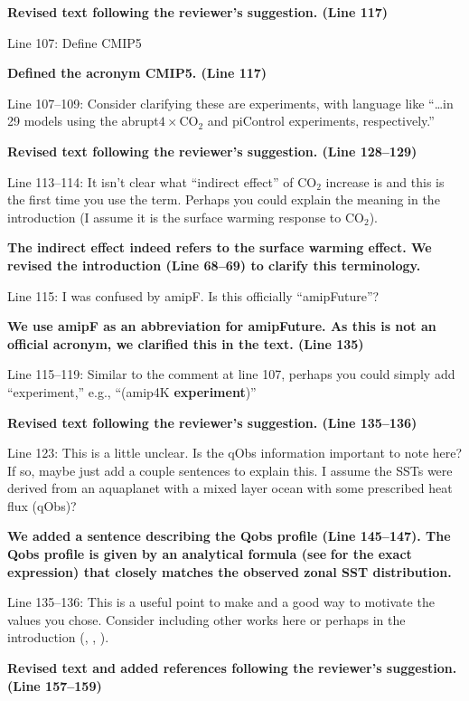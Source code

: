 \documentclass[11pt]{article}
\begin{document}
\textbf{Revised text following the reviewer's suggestion. (Line 117)}

Line 107: Define CMIP5

\textbf{Defined the acronym CMIP5. (Line 117)}

Line 107--109: Consider clarifying these are experiments, with language like ``\ldots{}in 29 models using the abrupt\(4\times\)CO\(_2\) and piControl experiments, respectively.''

\textbf{Revised text following the reviewer's suggestion. (Line 128--129)}

Line 113--114: It isn't clear what ``indirect effect'' of CO\(_2\) increase is and this is the first time you use the term. Perhaps you could explain the meaning in the introduction (I assume it is the surface warming response to CO\(_2\)).

\textbf{The indirect effect indeed refers to the surface warming effect. We revised the introduction (Line 68--69) to clarify this terminology.}

Line 115: I was confused by amipF. Is this officially ``amipFuture''?

\textbf{We use amipF as an abbreviation for amipFuture. As this is not an official acronym, we clarified this in the text. (Line 135)}

Line 115--119: Similar to the comment at line 107, perhaps you could simply add ``experiment,'' e.g., ``(amip4K \textbf{experiment})''

\textbf{Revised text following the reviewer's suggestion. (Line 135--136)}

Line 123: This is a little unclear. Is the qObs information important to note here? If so, maybe just add a couple sentences to explain this. I assume the SSTs were derived from an aquaplanet with a mixed layer ocean with some prescribed heat flux (qObs)?

\textbf{We added a sentence describing the Qobs profile (Line 145--147). The Qobs profile is given by an analytical formula (see} \cite{neale_standard_2000} \textbf{for the exact expression) that closely matches the observed zonal SST distribution.}

Line 135--136: This is a useful point to make and a good way to motivate the values you chose. Consider including other works here or perhaps in the introduction (\cite{jang_simulation_2013}, \cite{ham_what_2013}, \cite{kim_ninosouthern_2011}).

\textbf{Revised text and added references following the reviewer's suggestion. (Line 157--159)}
\end{document}

